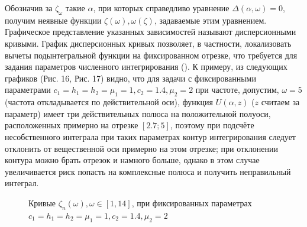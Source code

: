 \documentclass[a4paper, 12pt]{article}
\begin{document}
Обозначив за $\zeta_\omega$ такие $\alpha$, при которых справедливо уравнение $\Delta(\alpha,\omega)=0$, получим неявные функции $\zeta(\omega), \omega(\zeta)$, задаваемые этим уравнением. Графическое представление указанных зависимостей называют дисперсионными кривыми. График дисперсионных кривых позволяет, в частности, локализовать вычеты подынтегральной функции на фиксированном отрезке, что требуется для задания параметров численного интегрирования (\cite{new}).
К примеру, из следующих графиков (Рис. 16, Рис. 17) видно, что для задачи с фиксированными параметрами $c_1=h_1=h_2=\mu_1=1, c_2=1.4, \mu_2=2$ при частоте, допустим, $\omega=5$ (частота откладывается по действительной оси), функция $U(\alpha,z)$ ($z$ считаем за параметр) имеет три действительных полюса на положительной полуоси, расположенных примерно на отрезке  $[2.7;5]$, поэтому при подсчёте несобственного интеграла при таких параметрах контур интегрирования следует отклонить от вещественной оси примерно на этом отрезке; при отклонении контура можно брать отрезок и намного больше, однако в этом случае увеличивается риск попасть на комплексные полюса и получить неправильный интеграл.

\begin{figure}[h!]
\noindent{}
\caption{Кривые $\zeta_n(\omega), \omega \in [1,14]$, при фиксированных параметрах $c_1=h_1=h_2=\mu_1=1,c_2=1.4,\mu_2=2$}
\label{figCurves}
\end{figure}
\end{document}
